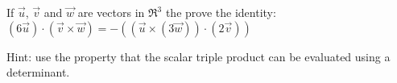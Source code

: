 
\begin{Exercise}[
name={},
title={}, 
difficulty=0,
origin={\cite{BS}}]
If $\vec{u}$, $\vec{v}$ and $\vec{w}$ are vectors in $\Re^3$ the prove the identity:
$(6\vec{u})\cdot(\vec{v}\times\vec{w})=-\left(\left(\vec{u}\times(3\vec{w})\right)\cdot(2\vec{v})\right)$
\end{Exercise}

\begin{Answer}
Hint: use the property that the scalar triple product can be evaluated using a determinant.
\end{Answer}
